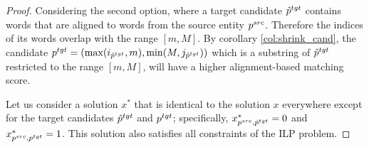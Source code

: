 \begin{proof}
  Considering the second option, where a target candidate \( \hat{p}^{tgt} \) contains words
  that are aligned to words from the source entity \( p^{src} \). Therefore the indices of its words
  overlap with the range \( [ m, M ] \).
  By corollary \ref{col:shrink_cand}, the candidate \( p^{tgt} = ( \max(i_{\hat{p}^{tgt}}, m), \min(M, j_{\hat{p}^{tgt}}) ) \)
  which is a substring of \( \hat{p}^{tgt} \) restricted to the range \( [m, M] \), will have a higher alignment-based
  matching score.

  Let us consider a solution \( x^* \) that is identical to the solution \( x \)
  everywhere except for the target candidates \( \hat{p}^{tgt} \) and \( p^{tgt} \);
  specifically, \( x^*_{p^{src}, \hat{p}^{tgt}} = 0 \) and \( x^*_{p^{src}, p^{tgt}} = 1 \).
  This solution also satisfies all constraints of the ILP problem.


\end{proof}
